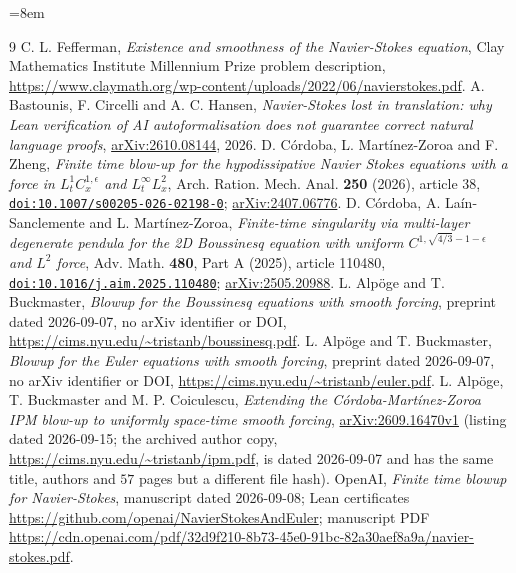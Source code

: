\documentclass[11pt]{article}
\theoremstyle{remark}
\newcommand{\fp}[1]{\nolinkurl{#1}}
\begin{document}
\clearpage
\sloppy
\emergencystretch=8em
\raggedright
\begin{thebibliography}{9}
 C. L. Fefferman, \emph{Existence and smoothness of the Navier-Stokes equation},
Clay Mathematics Institute Millennium Prize problem description,
\url{https://www.claymath.org/wp-content/uploads/2022/06/navierstokes.pdf}.
 A. Bastounis, F. Circelli and A. C. Hansen, \emph{Navier-Stokes lost in translation: why
Lean verification of AI autoformalisation does not guarantee correct natural language proofs},
\href{https://arxiv.org/abs/2610.08144}{arXiv:2610.08144}, 2026.
 D. C\'ordoba, L. Mart\'inez-Zoroa and F. Zheng, \emph{Finite time blow-up for the
hypodissipative Navier Stokes equations with a force in $L^{1}_{t}C^{1,\epsilon}_{x}$ and
$L^{\infty}_{t}L^{2}_{x}$}, Arch. Ration. Mech. Anal. \textbf{250} (2026), article 38,
\href{https://doi.org/10.1007/s00205-026-02198-0}{\fp{doi:10.1007/s00205-026-02198-0}};
\href{https://arxiv.org/abs/2407.06776}{arXiv:2407.06776}.
 D. C\'ordoba, A. La\'in-Sanclemente and L. Mart\'inez-Zoroa, \emph{Finite-time
singularity via multi-layer degenerate pendula for the 2D Boussinesq equation with uniform
$C^{1,\sqrt{4/3}-1-\epsilon}$ and $L^{2}$ force}, Adv. Math. \textbf{480}, Part A (2025), article 110480,
\href{https://doi.org/10.1016/j.aim.2025.110480}{\fp{doi:10.1016/j.aim.2025.110480}};
\href{https://arxiv.org/abs/2505.20988}{arXiv:2505.20988}.
 L. Alp\"oge and T. Buckmaster, \emph{Blowup for the Boussinesq equations with
smooth forcing}, preprint dated 2026-09-07, no arXiv identifier or DOI,
\url{https://cims.nyu.edu/~tristanb/boussinesq.pdf}.
 L. Alp\"oge and T. Buckmaster, \emph{Blowup for the Euler equations with
smooth forcing}, preprint dated 2026-09-07, no arXiv identifier or DOI,
\url{https://cims.nyu.edu/~tristanb/euler.pdf}.
 L. Alp\"oge, T. Buckmaster and M. P. Coiculescu, \emph{Extending the
C\'ordoba-Mart\'inez-Zoroa IPM blow-up to uniformly space-time smooth forcing},
\href{https://arxiv.org/abs/2609.16470}{arXiv:2609.16470v1} (listing dated 2026-09-15; the archived author copy,
\url{https://cims.nyu.edu/~tristanb/ipm.pdf}, is dated 2026-09-07 and has the same title, authors and
$57$ pages but a different file hash).
 OpenAI, \emph{Finite time blowup for Navier-Stokes}, manuscript dated 2026-09-08; Lean certificates
\url{https://github.com/openai/NavierStokesAndEuler}; manuscript PDF
\url{https://cdn.openai.com/pdf/32d9f210-8b73-45e0-91bc-82a30aef8a9a/navier-stokes.pdf}.

\end{thebibliography}
\end{document}

